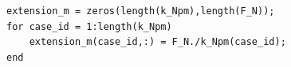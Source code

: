 \documentclass[border=12pt]{standalone}
\begin{document}
\begin{lstlisting}[style=matlab]
extension_m = zeros(length(k_Npm),length(F_N));
for case_id = 1:length(k_Npm)
    extension_m(case_id,:) = F_N./k_Npm(case_id);
end
\end{lstlisting}
\end{document}
